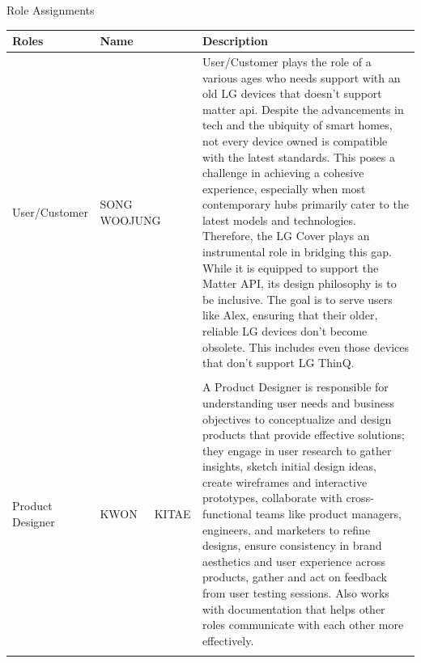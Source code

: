 \documentclass[conference]{IEEEtran}
\begin{document}
\large{Role Assignments}
\begin{table}[H]
\center
\begin{tabular}{m{1.7cm} m{1.4cm} m{4.0cm}}
\toprule
Roles & Name & Description\\
\midrule
User/Customer & SONG WOOJUNG &User/Customer plays the role of a various ages who needs support with an old LG devices that doesn’t support matter api. Despite the advancements in tech and the ubiquity of smart homes, not every device owned is compatible with the latest standards. This poses a challenge in achieving a cohesive experience, especially when most contemporary hubs primarily cater to the latest models and technologies. Therefore, the LG Cover plays an instrumental role in bridging this gap. While it is equipped to support the Matter API, its design philosophy is to be inclusive. The goal is to serve users like Alex, ensuring that their older, reliable LG devices don't become obsolete. This includes even those devices that don't support LG ThinQ.\\\\
Product Designer & KWON\ \ \ KITAE & A Product Designer is responsible for understanding user needs and business objectives to conceptualize and design products that provide effective solutions; they engage in user research to gather insights, sketch initial design ideas, create wireframes and interactive prototypes, collaborate with cross-functional teams like product managers, engineers, and marketers to refine designs, ensure consistency in brand aesthetics and user experience across products, gather and act on feedback from user testing sessions. Also works with documentation that helps other roles communicate with each other more effectively.\\\\
\bottomrule
\end{tabular}
\end{table}
\newpage
\end{document}
